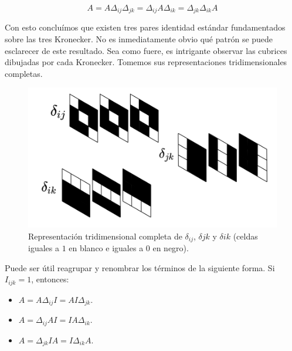 $$A = A \Delta_{ij} \Delta_{jk} = \Delta_{ij} A \Delta_{ik} = \Delta_{jk} \Delta_{ik} A$$


\newpage

Con esto concluímos que existen tres pares identidad estándar fundamentados sobre las tres Kronecker. No es inmediatamente obvio qué patrón se puede esclarecer de este resultado. Sea como fuere, es intrigante observar las cubrices dibujadas por cada Kronecker. Tomemos sus representaciones tridimensionales completas.

\begin{figure}[H]
	\includegraphics[width=\linewidth]{media/kroneckers.png}
	\caption{Representación tridimensional completa de $\delta_{ij}$, $\delta{jk}$ y $\delta{ik}$ (celdas iguales a $1$ en blanco e iguales a $0$ en negro).}
\end{figure}

Puede ser útil reagrupar y renombrar los términos de la siguiente forma. Si $I_{ijk} = 1$, entonces:

\begin{itemize}
	\item $A = A \Delta_{ij} I = A I \Delta_{jk}$.
	\item $A = \Delta_{ij} A I = I A \Delta_{ik}$.
	\item $A = \Delta_{jk} I A = I \Delta_{ik} A$.
\end{itemize}

\newpage
